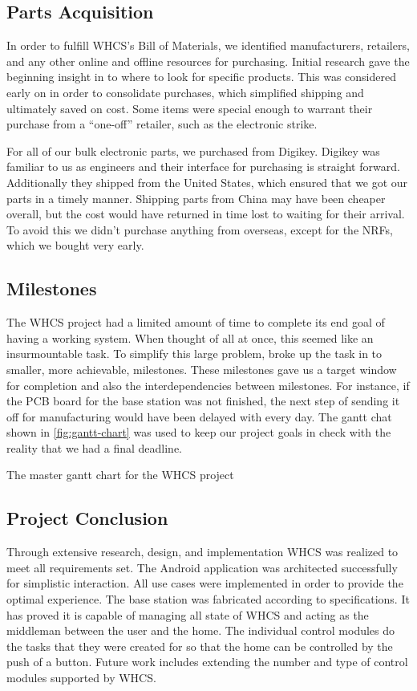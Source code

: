 \subsection{Parts Acquisition}
In order to fulfill WHCS's Bill of Materials, we identified
manufacturers, retailers, and any other online and offline resources for
purchasing. Initial research gave the beginning insight in to where to look for
specific products. This was considered early on in order to consolidate
purchases, which simplified shipping and ultimately saved on cost. Some items
were special enough to warrant their purchase from a ``one-off'' retailer, such as the
electronic strike.

For all of our bulk electronic parts, we purchased from Digikey.
Digikey was familiar to us as engineers and
their interface for purchasing is straight forward. Additionally they shipped from
the United States, which ensured that we got our parts in a timely manner.
Shipping parts from China may have been cheaper overall, but the cost would have returned in
time lost to waiting for their arrival. To avoid this we didn't purchase
anything from overseas, except for the NRFs, which we bought very early.

\subsection{Milestones}
The WHCS project had a limited amount of time to complete its end goal of
having a working system. When thought of all at once, this seemed like an
insurmountable task. To simplify this large problem, broke up the task
in to smaller, more achievable, milestones. These milestones gave us a target
window for completion and also the interdependencies between milestones. For
instance, if the PCB board for the base station was not finished, the next step
of sending it off for manufacturing would have been delayed with every day.
The gantt chat
shown in \autoref{fig:gantt-chart} was used to keep our project goals in check
with the reality that we had a final deadline.

{The master gantt chart for the WHCS project}

\subsection{Project Conclusion}

Through extensive research, design, and implementation
WHCS was realized to meet all requirements set. The
Android application was architected successfully for simplistic 
interaction. All use cases were implemented in order
to provide the optimal experience. The base station was
fabricated according to specifications. It has proved it is
capable of managing all state of WHCS and acting as the
middleman between the user and the home. The individual
control modules do the tasks that they were created for so
that the home can be controlled by the push of a button.
Future work includes extending the number and type of
control modules supported by WHCS.

